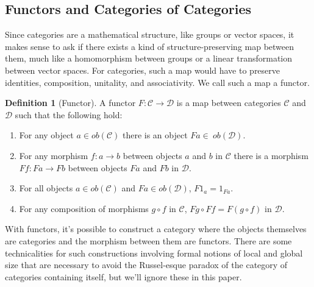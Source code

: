 \documentclass{article}
\theoremstyle{definition}
\newtheorem{definition}{Definition}
\begin{document}
\subsection*{Functors and Categories of Categories}
Since categories are a mathematical structure, like groups or vector spaces, it makes sense to ask if there exists a kind of structure-preserving map between them, much like a homomorphism between groups or a linear transformation between vector spaces.
For categories, such a map would have to preserve identities, composition, unitality, and associativity.
We call such a map a functor.
\begin{definition}[Functor]
    A functor $F:\mathcal{C}\rightarrow\mathcal{D}$ is a map between categories $\mathcal{C}$ and $\mathcal{D}$ such that the following hold:
    \begin{enumerate}
        \item For any object $a\in ob(\mathcal{C})$ there is an object $Fa\in\ ob(\mathcal{D})$.
        \item For any morphism $f:a\rightarrow b$ between objects $a$ and $b$ in $\mathcal{C}$ there is a morphism $Ff:Fa\rightarrow Fb$ between objects $Fa$ and  $Fb$ in $\mathcal{D}$.
        \item For all objects $a\in ob(\mathcal{C})$ and $Fa\in ob(\mathcal{D})$, $F1_a=1_{Fa}$.
        \item For any composition of morphisms $g\circ f$ in $\mathcal{C}$, $Fg\circ Ff=F(g\circ f)$ in $\mathcal{D}$.
    \end{enumerate}
\end{definition}
With functors, it's possible to construct a category where the objects themselves are categories and the morphism between them are functors.
There are some technicalities for such constructions involving formal notions of local and global size that are necessary to avoid the Russel-esque paradox of the category of categories containing itself, but we'll ignore these in this paper.
\end{document}
